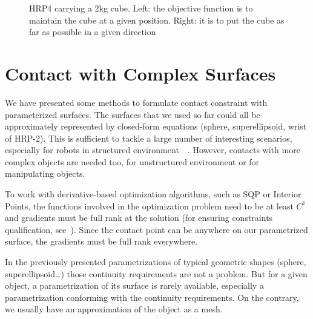 \begin{figure}
\centering
  \centering
  \setlength\fboxsep{0pt}
  \setlength\fboxrule{1pt}
\caption{HRP4 carrying a 2kg cube.
Left: the objective function is to maintain the cube at a given position.
Right: it is to put the cube as far as possible in a given direction}
\label{fig:hrp4_cube}
\end{figure}

\section{Contact with Complex Surfaces}
\label{sec:contact_with_complex_surfaces}

We have presented some methods to formulate contact constraint with parameterized surfaces.
The surfaces that we used so far could all be approximately represented by closed-form equations (sphere, superellipsoid, wrist of HRP-2).
This is sufficient to tackle a large number of interesting scenarios, especially for robots in structured environment~\cite{vaillant:humanoids:2014}~\cite{vaillant:autonomousrobots:2016}.
However, contacts with more complex objects are needed too, for unstructured environment or for manipulating objects.

To work with derivative-based optimization algorithms, such as SQP or Interior Points, the functions involved in the optimization problem need to be at least $C^1$ and gradients must be full rank at the solution (for ensuring constraints qualification, see~\cite{nocedal:book:2006}).
Since the contact point can be anywhere on our parametrized surface, the gradients must be full rank everywhere.

In the previously presented parametrizations of typical geometric shapes (sphere, superellipsoid\ldots) those continuity requirements are not a problem.
But for a given object, a parametrization of its surface is rarely available, especially a parametrization conforming with the continuity requirements.
On the contrary, we usually have an approximation of the object as a mesh.

